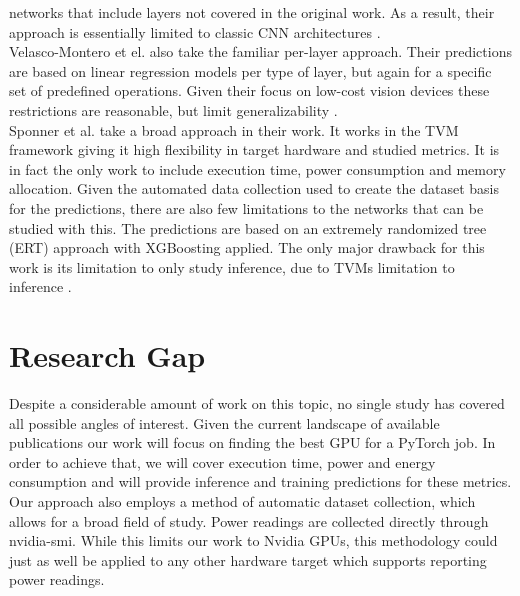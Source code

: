 networks that include layers not covered in the original work. As a result, their approach is essentially
limited to classic CNN architectures \cite{gianniti_performance_nodate}. \\
Velasco-Montero et el. also take the familiar per-layer approach. Their predictions are based on linear
regression models per type of layer, but again for a specific set of predefined operations. Given their 
focus on low-cost vision devices these restrictions are reasonable, but limit generalizability \cite{velasco-montero_previous_2020}. \\
Sponner et al. take a broad approach in their work. It works in the TVM framework giving it high flexibility
in target hardware and studied metrics. It is in fact the only work to include execution time, power
consumption and memory allocation. Given the automated data collection used to create the dataset basis
for the predictions, there are also few limitations to the networks that can be studied with this. 
The predictions are based on an extremely randomized tree (ERT) approach with XGBoosting applied. The 
only major drawback for this work is its limitation to only study inference, due to TVMs limitation to inference \cite{sponner_ai-driven_2022}. \\



\section{Research Gap}


Despite a considerable amount of work on this topic, no single study has covered all possible angles of interest. Given the current landscape of available publications our work will focus on finding the best GPU for a PyTorch job. In order to achieve that, we will cover execution time, power and energy consumption and will provide inference and training predictions for these metrics. Our approach also employs a method of automatic dataset collection, which allows for a broad field of study. Power readings are collected directly through nvidia-smi. While this limits our work to Nvidia GPUs, this methodology could just as well be applied to any other hardware target which supports reporting power readings.
